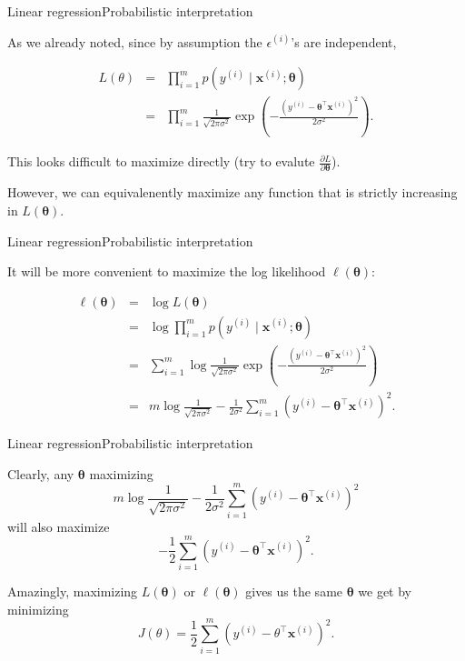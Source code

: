 \documentclass{beamer}
\renewcommand{\vec}[1]{\boldsymbol{#1}}
\begin{document}
\begin{frame}{Linear regression}{Probabilistic interpretation}

  As we already noted, since by assumption the $\epsilon^{(i)}$'s are
  independent,

  \begin{eqnarray}
    L(\theta) & = & \prod_{i=1}^m p(y^{(i)} \mid \vec{x}^{(i)} ; \vec{\theta}) \nonumber \\
    & = & \prod_{i=1}^m \frac{1}{\sqrt{2\pi\sigma^2}}\exp{\left( - \frac{(y^{(i)} - \vec{\theta}^\top \vec{x}^{(i)})^2}{2\sigma^2}\right)}. \nonumber
  \end{eqnarray}

  This looks difficult to maximize directly (try to evalute
  $\frac{\partial{L}}{\partial{\vec{\theta}}}$).

  \medskip

  However, we can equivalenently maximize \alert{any function that is
    strictly increasing} in $L(\vec{\theta})$.

\end{frame}


\begin{frame}{Linear regression}{Probabilistic interpretation}

  It will be more convenient to maximize the
  \alert{log likelihood} $\ell(\vec{\theta})$:

  \begin{eqnarray}
    \ell(\vec{\theta}) & = & \log L(\vec{\theta}) \nonumber \\
    & = & \log \prod_{i=1}^m p(y^{(i)} \mid \vec{x}^{(i)} ; \vec{\theta}) \\
    & = & \sum_{i=1}^m \log \frac{1}{\sqrt{2\pi\sigma^2}}\exp{\left( - \frac{(y^{(i)} - \vec{\theta}^\top \vec{x}^{(i)})^2}{2\sigma^2}\right)} \nonumber \\
    & = & m \log \frac{1}{\sqrt{2\pi\sigma^2}} - \frac{1}{2\sigma^2}\sum_{i=1}^m(y^{(i)} - \vec{\theta}^\top\vec{x}^{(i)})^2. \nonumber
  \end{eqnarray}

\end{frame}


\begin{frame}{Linear regression}{Probabilistic interpretation}

  Clearly, any $\vec{\theta}$ maximizing
  \[ m \log \frac{1}{\sqrt{2\pi\sigma^2}} - \frac{1}{2\sigma^2}\sum_{i=1}^m(y^{(i)} - \vec{\theta}^\top\vec{x}^{(i)})^2 \]
  will also maximize
  \[ - \frac{1}{2}\sum_{i=1}^m(y^{(i)} - \vec{\theta}^\top\vec{x}^{(i)})^2 .\]

  \bigskip

  Amazingly, maximizing $L(\vec{\theta})$ or $\ell(\vec{\theta})$
  gives us the same $\vec{\theta}$ we get by minimizing
  \[ J(\theta) = \frac{1}{2}\sum_{i=1}^m(y^{(i)}-\theta^\top\vec{x}^{(i)})^2 .\]

\end{frame}
\end{document}
